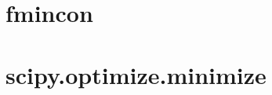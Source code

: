 \begin{anexosenv}

\partanexos

\chapter{fmincon}
\label{ch:fmincon}



\chapter{scipy.optimize.minimize}
\label{ch:scipy_optimize_minimize}




\end{anexosenv}